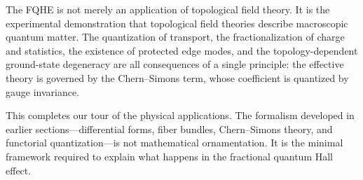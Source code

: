 The FQHE is not merely an application of topological field theory. It is the experimental demonstration that topological field theories describe macroscopic quantum matter. The quantization of transport, the fractionalization of charge and statistics, the existence of protected edge modes, and the topology-dependent ground-state degeneracy are all consequences of a single principle: the effective theory is governed by the Chern--Simons term, whose coefficient is quantized by gauge invariance.

This completes our tour of the physical applications. The formalism developed in earlier sections---differential forms, fiber bundles, Chern--Simons theory, and functorial quantization---is not mathematical ornamentation. It is the minimal framework required to explain what happens in the fractional quantum Hall effect.

